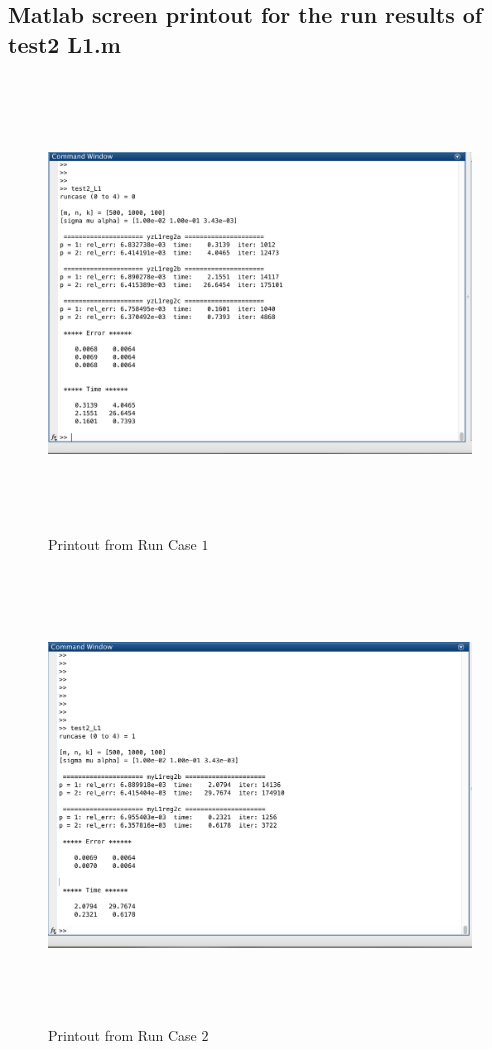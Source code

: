 \subsection{Matlab screen printout for the run results of \textrm{test2 L1.m}}
\begin{figure}[H]
\centering
\includegraphics[height=12cm]{p_1}
\caption{Printout from Run Case $1$}
\end{figure}
\begin{figure}[H]
\centering
\includegraphics[height=12cm]{p_2}
\caption{Printout from Run Case $2$}
\end{figure}
